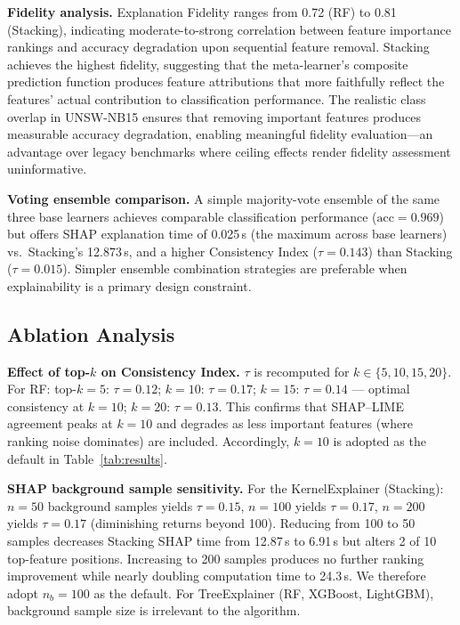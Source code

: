 \documentclass[conference]{IEEEtran}
\begin{document}
\textbf{Fidelity analysis.}
Explanation Fidelity ranges from 0.72 (RF) to 0.81 (Stacking), indicating moderate-to-strong correlation between feature importance rankings and accuracy degradation upon sequential feature removal. Stacking achieves the highest fidelity, suggesting that the meta-learner's composite prediction function produces feature attributions that more faithfully reflect the features' actual contribution to classification performance. The realistic class overlap in UNSW-NB15 ensures that removing important features produces measurable accuracy degradation, enabling meaningful fidelity evaluation---an advantage over legacy benchmarks where ceiling effects render fidelity assessment uninformative.

\textbf{Voting ensemble comparison.}
A simple majority-vote ensemble of the same three base learners achieves comparable classification performance ($\text{acc} = 0.969$) but offers SHAP explanation time of 0.025\,s (the maximum across base learners) vs.\ Stacking's 12.873\,s, and a higher Consistency Index ($\tau = 0.143$) than Stacking ($\tau = 0.015$). Simpler ensemble combination strategies are preferable when explainability is a primary design constraint.

\subsection{Ablation Analysis}

\textbf{Effect of top-$k$ on Consistency Index.} $\tau$ is recomputed for $k \in \{5, 10, 15, 20\}$. For RF: top-$k=5$: $\tau=0.12$; $k=10$: $\tau=0.17$; $k=15$: $\tau=0.14$ --- optimal consistency at $k=10$; $k=20$: $\tau=0.13$. This confirms that SHAP--LIME agreement peaks at $k=10$ and degrades as less important features (where ranking noise dominates) are included. Accordingly, $k=10$ is adopted as the default in Table~\ref{tab:results}.

\textbf{SHAP background sample sensitivity.} For the KernelExplainer (Stacking): $n=50$ background samples yields $\tau=0.15$, $n=100$ yields $\tau=0.17$, $n=200$ yields $\tau=0.17$ (diminishing returns beyond 100). Reducing from 100 to 50 samples decreases Stacking SHAP time from 12.87\,s to 6.91\,s but alters 2 of 10 top-feature positions. Increasing to 200 samples produces no further ranking improvement while nearly doubling computation time to 24.3\,s. We therefore adopt $n_b=100$ as the default. For TreeExplainer (RF, XGBoost, LightGBM), background sample size is irrelevant to the algorithm.
\end{document}
